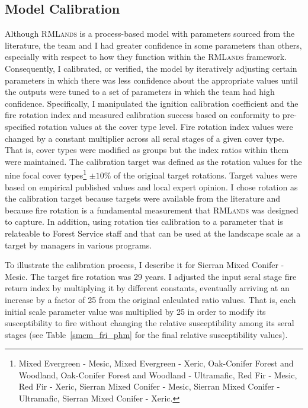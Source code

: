 \subsection{Model Calibration}
Although \textsc{RMLands} is a process-based model with parameters sourced from the literature, the team and I had greater confidence in some parameters than others, especially with respect to how they function within the \textsc{RMLands} framework. Consequently, I calibrated, or verified, the model by iteratively adjusting certain parameters in which there was less confidence about the appropriate values until the outputs were tuned to a set of parameters in which the team had high confidence. Specifically, I manipulated the ignition calibration coefficient and the fire rotation index and measured calibration success based on conformity to pre-specified rotation values at the cover type level. Fire rotation index values were changed by a constant multiplier across all seral stages of a given cover type. That is, cover types were modified as groups but the index ratios within them were maintained. The calibration target was defined as the rotation values for the nine focal cover types\footnote{Mixed Evergreen - Mesic, Mixed Evergreen - Xeric, Oak-Conifer Forest and Woodland, Oak-Conifer Forest and Woodland - Ultramafic, Red Fir - Mesic, Red Fir - Xeric, Sierran Mixed Conifer - Mesic, Sierran Mixed Conifer - Ultramafic, Sierran Mixed Conifer - Xeric.}  $\pm 10$\% of the original target rotations. Target values were based on empirical published values and local expert opinion. I chose rotation as the calibration target because targets were available from the literature and because fire rotation is a fundamental measurement that \textsc{RMLands} was designed to capture. In addition, using rotation ties calibration to a parameter that is relateable to Forest Service staff and that can be used at the landscape scale as a target by managers in various programs.

To illustrate the calibration process, I describe it for Sierran Mixed Conifer - Mesic. The target fire rotation was 29 years. I adjusted the input seral stage fire return index by multiplying it by different constants, eventually arriving at an increase by a factor of 25 from the original calculated ratio values. That is, each initial scale parameter value was multiplied by 25 in order to modify its susceptibility to fire without changing the relative susceptibility among its seral stages (see Table~\ref{smcm_fri_phm} for the final relative susceptibility values). 



